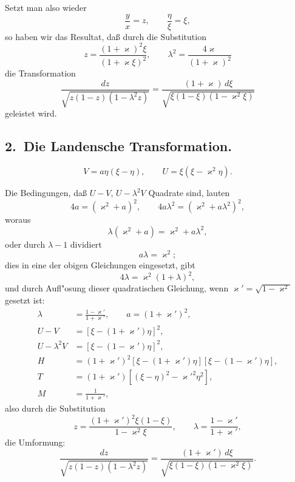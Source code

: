 \documentclass[12pt,a4paper]{article}
\theoremstyle{definition}
\begin{document}
Setzt man also wieder
\[\frac{y}{x} = z,\qquad \frac{\eta}{\xi} = \xi,
\]
so haben wir das Resultat, da\ss{}{} durch die Substitution
\begin{equation}\tag{2}
z = \frac{(1+\varkappa)^2\xi}{(1+\varkappa\xi)^2},\qquad \lambda^2 = \frac{4\varkappa}{(1+\varkappa)^2}
\end{equation}
die Transformation
\begin{equation}\tag{3}
\frac{dz}{\sqrt{z(1-z)(1-\lambda^2z)}} = \frac{(1+\varkappa)\,d\xi}{\sqrt{\xi(1-\xi)(1-\varkappa^2\xi)}}
\end{equation}
geleistet wird.

\newpage

\subsection*{2.~Die Landensche Transformation.}
\[V = a\eta(\xi-\eta),\qquad U = \xi(\xi-\varkappa^2\eta).\]

Die Bedingungen, da\ss{}{} $U-V$, $U-\lambda^2V$ Quadrate sind, lauten
\[4a = (\varkappa^2+a)^2,\qquad 4a\lambda^2 = (\varkappa^2+a\lambda^2)^2,
\]
woraus
\[\lambda(\varkappa^2+a) = \varkappa^2+a\lambda^2,
\]
oder durch $\lambda-1$ dividiert
\[a\lambda = \varkappa^2;
\]
dies in eine der obigen Gleichungen eingesetzt, gibt
\[4\lambda = \varkappa^2(1+\lambda)^2,
\]
und durch Aufl"osung dieser quadratischen Gleichung, wenn $\varkappa' = \sqrt{1-\varkappa^2}$ gesetzt ist:
\begin{align*}
\lambda &= \frac{1-\varkappa'}{1+\varkappa'},\qquad a = (1+\varkappa')^2,\\
U-V &= [\xi - (1+\varkappa')\eta]^2,\\
U-\lambda^2V &= [\xi - (1-\varkappa')\eta]^2,\\
H &= (1+\varkappa')^2[\xi-(1+\varkappa')\eta][\xi-(1-\varkappa')\eta],\\
T &= (1+\varkappa')[(\xi-\eta)^2 - \varkappa'^2\eta^2],\\
M &= \frac{1}{1+\varkappa'},
\end{align*}
also durch die Substitution
\begin{equation}\tag{4}
z = \frac{(1+\varkappa')^2\xi(1-\xi)}{1-\varkappa^2\xi},\qquad \lambda = \frac{1-\varkappa'}{1+\varkappa'},
\end{equation}
die Umformung:
\begin{equation}\tag{5}
\frac{dz}{\sqrt{z(1-z)(1-\lambda^2z)}} = \frac{(1+\varkappa')\,d\xi}{\sqrt{\xi(1-\xi)(1-\varkappa^2\xi)}}.
\end{equation}
\end{document}
